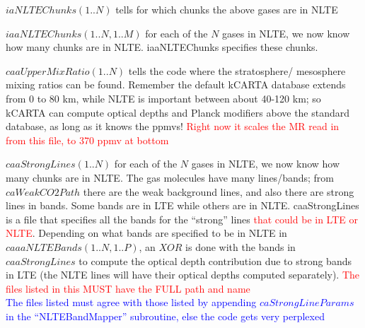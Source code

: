 \documentclass[12pt]{article}
\begin{document}
{{\noindent $iaNLTEChunks(1..N)$ tells for which chunks the above gases are in 
NLTE

\noindent $iaaNLTEChunks(1..N,1..M)$ for each of the $N$ gases in NLTE, we now 
know how many chunks are in NLTE. iaaNLTEChunks specifies these chunks.


\noindent $caaUpperMixRatio(1..N)$ tells the code where the stratosphere/ 
mesosphere mixing ratios can be found. Remember the default kCARTA
database extends from 0 to 80 km, while NLTE is important between about
40-120 km; so kCARTA can compute optical depths and Planck modifiers above
the standard database, as long as it knows the ppmvs!
\textcolor{red}
{Right now it scales the MR read in from this file, to 370 ppmv at bottom}

\noindent $caaStrongLines(1..N)$ for each of the $N$ gases in NLTE, we now 
know how many chunks are in NLTE. The gas molecules have many lines/bands; 
from $caWeakCO2Path$ there are the weak background lines, and also there are
strong lines in bands. Some bands are in LTE while others are in NLTE. 
caaStrongLines is a file that specifies all the bands for the ``strong'' 
lines \textcolor{red}{that could be in LTE or NLTE}. Depending on what bands
are specified to be in NLTE in $caaaNLTEBands(1..N,1..P)$, an $XOR$ is done
with the bands in $caaStrongLines$ to compute the optical depth contribution
due to strong bands in LTE (the NLTE lines will have their optical depths 
computed separately). 
\textcolor{red}{The files listed in this MUST have the FULL path and name} \\
\textcolor{blue}{The files listed must agree with those listed by 
                appending $caStrongLineParams$ in the ``NLTEBandMapper'' 
                subroutine, else the code gets very perplexed}

}}
\end{document}
